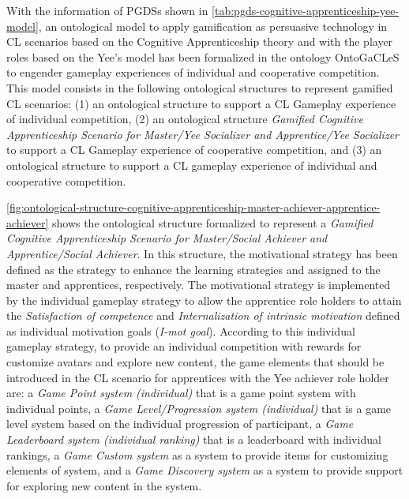 With the information of PGDSs shown in \autoref{tab:pgds-cognitive-apprenticeship-yee-model}, an ontological model to apply gamification as persuasive technology in CL scenarios based on the Cognitive Apprenticeship theory and with the player roles based on the Yee's model has been formalized in the ontology OntoGaCLeS to engender gameplay experiences of individual and cooperative competition. This model consists in the following ontological structures to represent gamified CL scenarios: (1) an ontological structure  to support a CL Gameplay experience of individual competition, (2) an ontological structure {\emph{Gamified Cognitive Apprenticeship Scenario for Master/Yee Socializer and Apprentice/Yee Socializer}} to support a CL Gameplay experience of cooperative competition, and (3) an ontological structure  to support a CL gameplay experience of individual and cooperative competition. 

\autoref{fig:ontological-structure-cognitive-apprenticeship-master-achiever-apprentice-achiever} shows the ontological structure formalized to represent a \emph{Gamified Cognitive Apprenticeship Scenario for Master/Social Achiever and Apprentice/Social Achiever}. In this structure, the motivational strategy  has been defined as the strategy to enhance the learning strategies  and  assigned to the master and apprentices, respectively. The motivational strategy  is implemented by the individual gameplay strategy  to allow the apprentice role holders to attain the \emph{Satisfaction of competence} and \emph{Internalization of intrinsic motivation} defined as individual motivation goals (\emph{I-mot goal}). According to this individual gameplay strategy, to provide an individual competition with rewards for customize avatars and explore new content, the game elements that should be introduced in the CL scenario for apprentices with the Yee achiever role holder are: a \emph{Game Point system (individual)} that is a game point system with individual points, a \emph{Game Level/Progression system (individual)} that is a game level system based on the individual progression of participant, a \emph{Game Leaderboard system (individual ranking)} that is a leaderboard with individual rankings, a \emph{Game Custom system} as a system to provide items for customizing elements of system, and a \emph{Game Discovery system} as a system to provide support for exploring new content in the system.

